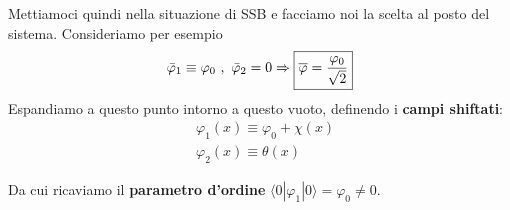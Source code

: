 \documentclass[../main.tex]{subfiles}
\begin{document}
Mettiamoci quindi nella situazione di SSB e facciamo noi la scelta al posto del sistema. Consideriamo per esempio
\[
\Bar\varphi_1 \equiv \varphi_0 ~,~\Bar\varphi_2 = 0 \Rightarrow \boxed{\overline{\varphi} = \frac{\varphi_0}{\sqrt{2}}}
\]
Espandiamo a questo punto intorno a questo vuoto, definendo i \textbf{campi shiftati}:
\begin{equation}
    \boxed{
    \begin{aligned}
        &\varphi_1(x)\equiv \varphi_0 + \chi(x) \\
        &\varphi_2(x)\equiv \theta(x)
    \end{aligned}}
    \label{eq:shifted fields}
\end{equation}


Da cui ricaviamo il \textbf{parametro d'ordine} $\langle0|\varphi_1|0\rangle= \varphi_0\neq0$.
\end{document}
